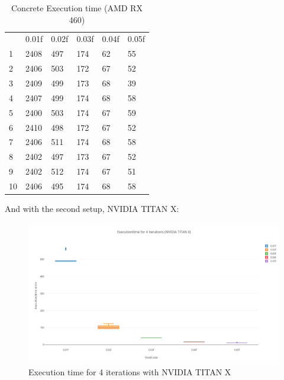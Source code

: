 \begin{table}[H]
\centering
\caption{Concrete Execution time (AMD RX 460)}
\begin{tabular}{llllll}
   & 0.01f & 0.02f & 0.03f & 0.04f & 0.05f \\
1  & 2408  & 497   & 174   & 62    & 55    \\
2  & 2406  & 503   & 172   & 67    & 52    \\
3  & 2409  & 499   & 173   & 68    & 39    \\
4  & 2407  & 499   & 174   & 68    & 58    \\
5  & 2400  & 503   & 174   & 67    & 59    \\
6  & 2410  & 498   & 172   & 67    & 52    \\
7  & 2406  & 511   & 174   & 68    & 58    \\
8  & 2402  & 497   & 173   & 67    & 52    \\
9  & 2402  & 512   & 174   & 67    & 51    \\
10 & 2406  & 495   & 174   & 68    & 58   
\end{tabular}
\end{table}
And with the second setup, NVIDIA TITAN X:

\begin{figure}[H]
	\centering
	\includegraphics[width=14cm]{images/AllfourIterationTITANX.png}
	\caption{Execution time for 4 iterations with NVIDIA TITAN X}
	\label{ExampleOCTImage}
\end{figure}

